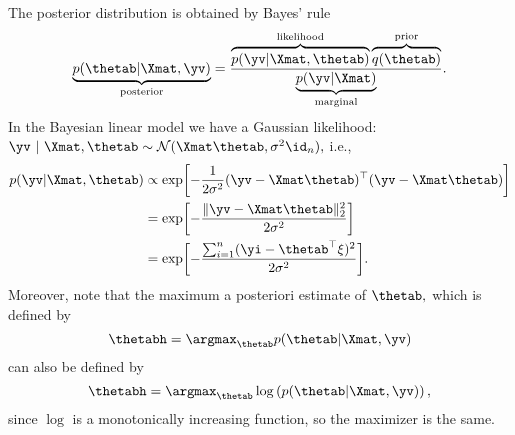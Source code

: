 
%
The posterior distribution is obtained by Bayes' rule 
%
$$
\underbrace{p(\thetab | \Xmat, \yv)}_{\text{posterior}} = \frac{\overbrace{p(\yv | \Xmat, \thetab)}^{\text{likelihood}}\overbrace{q(\thetab)}^{\text{prior}}}{\underbrace{p(\yv|\Xmat)}_{\text{marginal}}}. 
$$
% 
In the Bayesian linear model we have a Gaussian likelihood: $\yv ~|~ \Xmat, \thetab \sim \mathcal{N}(\Xmat \thetab, \sigma^2 \id_n),$ i.e.,
%
\begin{align*}
%	
	p(\yv | \Xmat, \thetab) 
%	
	&\propto	\exp\biggl[-\frac{1}{2\sigma^2}(\yv - \Xmat\thetab)^\top(\yv - \Xmat\thetab)\biggr] \\
%	
	&= \exp\biggl[-\frac{\| \yv - \Xmat\thetab \|_2^2}{2\sigma^2}\biggr] \\
%	
	&= \exp\biggl[-\frac{ \sum_{i=1}^n (\yi - \thetab^\top \xi)^2}{2\sigma^2}\biggr].
%	
\end{align*}
%
Moreover, note that the maximum a posteriori estimate of $\thetab,$ which is defined by
%
$$		\thetabh = \argmax_{\thetab} p(\thetab | \Xmat, \yv)	$$
%
can also be defined by 
%
%
$$		\thetabh = \argmax_{\thetab} \log \left( p(\thetab | \Xmat, \yv) \right),	$$
%
since $\log$ is a monotonically increasing function, so the maximizer is the same.
%
